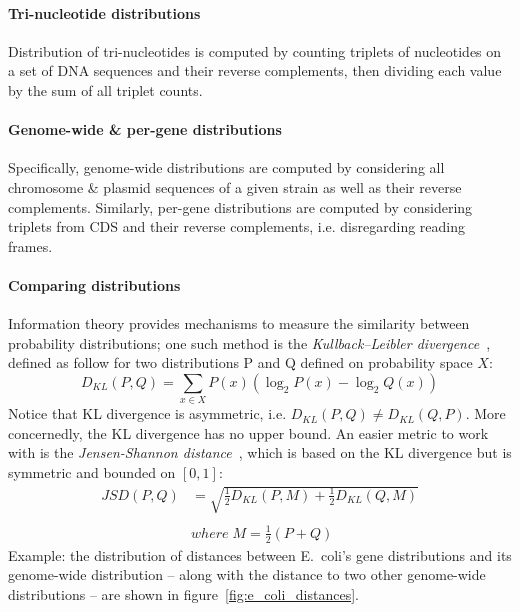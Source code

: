 \documentclass[12pt]{article}
\begin{document}
\paragraph{Tri-nucleotide distributions}
Distribution of tri-nucleotides is computed by counting triplets of nucleotides on a set of DNA sequences and their reverse complements, then dividing each value by the sum of all triplet counts.

\paragraph{Genome-wide \& per-gene distributions}
Specifically, genome-wide distributions are computed by considering all chromosome \& plasmid sequences of a given strain as well as their reverse complements. Similarly, per-gene distributions are computed by considering triplets from CDS and their reverse complements, i.e. disregarding reading frames.

\paragraph{Comparing distributions}
Information theory provides mechanisms to measure the similarity between probability distributions; one such method is the \textit{Kullback–Leibler divergence}~\cite{kullback1951information}, defined as follow for two distributions P and Q defined on probability space $X$:
%
\begin{equation}
D_{KL}(P, Q) = \sum\limits_{x \in X} P(x) (\log_2 P(x) - \log_2 Q(x))
\end{equation}
%
Notice that KL divergence is asymmetric, i.e. $D_{KL}(P, Q) \neq D_{KL}(Q, P)$. More concernedly, the KL divergence has no upper bound. An easier metric to work with is the \textit{Jensen-Shannon distance}~\cite{fuglede2004jensen}, which is based on the KL divergence but is symmetric and bounded on $[0, 1]$:
%
\begin{equation}
\begin{split}
JSD(P, Q) &= \sqrt{\frac{1}{2}D_{KL}(P, M) + \frac{1}{2}D_{KL}(Q, M)} \\
\\
& where \; M = \frac{1}{2}(P + Q)
\end{split}
\end{equation}
%
Example: the distribution of distances between E.~coli's gene distributions and its genome-wide distribution -- along with the distance to two other genome-wide distributions -- are shown in figure~\ref{fig:e_coli_distances}.
\end{document}
